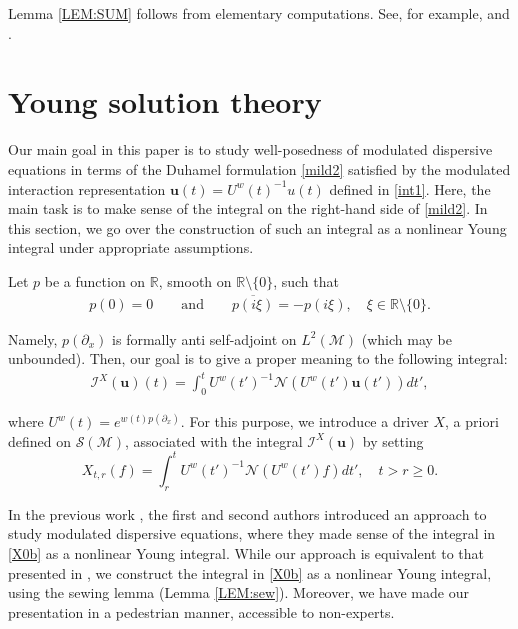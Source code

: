 \documentclass[letterpaper, 11pt,  reqno]{amsart}
\newcommand{\1}{\hspace{0.5mm}\text{I}\hspace{0.5mm}}
\newcommand{\I}{\mathcal{I}}
\newcommand{\noi}{\noindent}
\newcommand{\R}{\mathbb{R}}
\newcommand{\cj}{\overline}
\newcommand{\dx}{\partial_x}
\renewcommand{\S}{\mathcal{S}}
\newcommand{\M}{\mathcal{M}}
\newcommand{\NN}{\mathcal{N}}
\newcommand{\uw}{U^w}
\newcommand{\uu}{\mathbf{u}}
\numberwithin{equation}{section}
\numberwithin{theorem}{section}
\begin{document}
Lemma \ref{LEM:SUM} follows
from elementary  computations.
See, for example,  
 \cite[Lemma 4.2]{GTV} and \cite[Lemma 4.1]{MWX}.










\section{Young solution theory}
\label{SEC:Young}





Our main goal in this paper is to study well-posedness of 
modulated dispersive equations
in terms of the Duhamel formulation \eqref{mild2} satisfied
by the modulated interaction representation
$\uu(t)=\uw(t)^{-1}u(t)$ defined in \eqref{int1}.
Here,  the main task is to make sense of 
 the integral 
on the right-hand side of \eqref{mild2}.
In this section, we go over the construction of
such an integral as a  nonlinear Young integral
under appropriate assumptions.



Let $p$ be a function on $\R$, smooth on $\R \setminus\{0\}$, 
such that  
\begin{align}
p(0) = 0\qquad 
\text{and}\qquad 
\cj{p(i\xi)} = - p(i\xi), \quad \xi \in \R\setminus \{0\}.
\label{X0a}
\end{align}


\noi
Namely, $p(\dx)$ is formally anti self-adjoint on $L^2(\M)$
(which may be unbounded).
Then, our goal is to give a proper meaning to 
the following integral:
\begin{align}
\label{X0b}
\I^X(\uu)(t) = 
 \int_0^t \uw(t')^{-1}\NN(\uw(t') \uu(t'))dt' , 
\end{align}



\noi
where $U^w(t) = e^{ w(t)p(\dx)}$.
For this purpose, we
introduce a driver $X$, a priori defined on $\S(\M)$,  associated with the integral $\I^X(\uu)$
by setting 
\begin{equation}
X_{t,r}(f) = \int_r^t \uw(t')^{-1} \NN(\uw(t') f) dt', \quad t >  r \ge 0.
\label{X0}
\end{equation}





In the previous work 
\cite{CG1}, 
the first and second authors introduced 
an approach to study modulated dispersive equations, 
where they made sense of the integral in \eqref{X0b}
as a nonlinear Young integral.
While our approach is equivalent
to that presented in \cite{CG1}, 
we construct the integral in \eqref{X0b}
as a nonlinear Young integral, using the sewing lemma
(Lemma \ref{LEM:sew}).
Moreover, we have made our presentation 
in a pedestrian manner, accessible
to non-experts.
\end{document}
